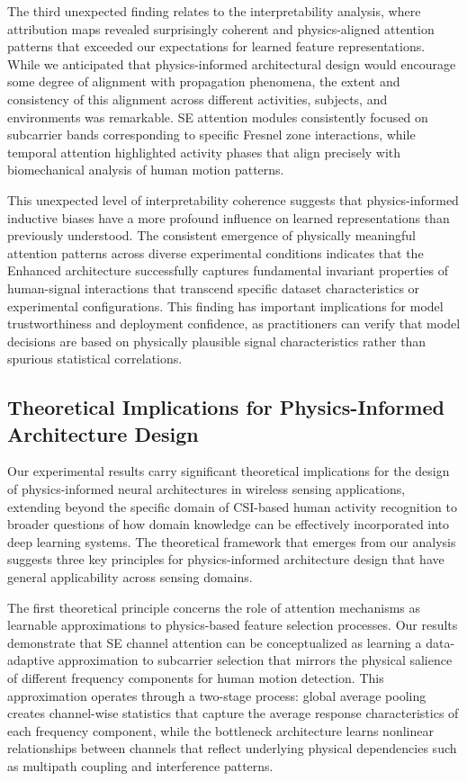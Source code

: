 \documentclass[journal]{IEEEtran}
\begin{document}
The third unexpected finding relates to the interpretability analysis, where attribution maps revealed surprisingly coherent and physics-aligned attention patterns that exceeded our expectations for learned feature representations. While we anticipated that physics-informed architectural design would encourage some degree of alignment with propagation phenomena, the extent and consistency of this alignment across different activities, subjects, and environments was remarkable. SE attention modules consistently focused on subcarrier bands corresponding to specific Fresnel zone interactions, while temporal attention highlighted activity phases that align precisely with biomechanical analysis of human motion patterns.

This unexpected level of interpretability coherence suggests that physics-informed inductive biases have a more profound influence on learned representations than previously understood. The consistent emergence of physically meaningful attention patterns across diverse experimental conditions indicates that the Enhanced architecture successfully captures fundamental invariant properties of human-signal interactions that transcend specific dataset characteristics or experimental configurations. This finding has important implications for model trustworthiness and deployment confidence, as practitioners can verify that model decisions are based on physically plausible signal characteristics rather than spurious statistical correlations.

\subsection{Theoretical Implications for Physics-Informed Architecture Design}

Our experimental results carry significant theoretical implications for the design of physics-informed neural architectures in wireless sensing applications, extending beyond the specific domain of CSI-based human activity recognition to broader questions of how domain knowledge can be effectively incorporated into deep learning systems. The theoretical framework that emerges from our analysis suggests three key principles for physics-informed architecture design that have general applicability across sensing domains.

The first theoretical principle concerns the role of attention mechanisms as learnable approximations to physics-based feature selection processes. Our results demonstrate that SE channel attention can be conceptualized as learning a data-adaptive approximation to subcarrier selection that mirrors the physical salience of different frequency components for human motion detection. This approximation operates through a two-stage process: global average pooling creates channel-wise statistics that capture the average response characteristics of each frequency component, while the bottleneck architecture learns nonlinear relationships between channels that reflect underlying physical dependencies such as multipath coupling and interference patterns.
\end{document}
